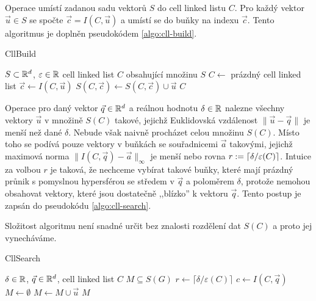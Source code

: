 Operace  umístí zadanou sadu vektorů $S$ do cell linked listu $C$. Pro každý vektor $\vec{u} \in S$ se spočte $\vec{c} = I(C, \vec{u})$ a umístí se do buňky na indexu $\vec{c}$. Tento algoritmus je doplněn pseudokódem \ref{algo:cll-build}.

\begin{algorithm}[ht!]
  \caption{CllBuild}
  \label{algo:cll-build}
  \begin{algorithmic}
    \Require $S \subset \mathbb{R}^d$, $\varepsilon \in \mathbb{R}$
    \Ensure cell linked list $C$ obsahující množinu $S$
    \State $C \leftarrow$ prázdný cell linked list
      \State $\vec{c} \leftarrow I(C, \vec{u})$
      \State $S(C, \vec{c}) \leftarrow S(C, \vec{c}) \cup \vec{u}$
    \EndFor
    \Return $C$
  \end{algorithmic}
\end{algorithm}

Operace  pro daný vektor $\vec{q} \in \mathbb{R}^d$ a reálnou hodnotu $\delta \in \mathbb{R}$ nalezne všechny vektory $\vec{u}$ v množině $S(C)$ takové, jejichž Euklidovská vzdálenost $\|\vec{u} - \vec{q}\|$ je menší než dané $\delta$. Nebude však naivně procházet celou množinu $S(C)$. Místo toho se podívá pouze vektory v buňkách se souřadnicemi $\vec{a}$ takovými, jejichž maximová norma $\|I(C, \vec{q}) - \vec{a}\|_\infty$ je menší nebo rovna $r := \lceil\delta / \varepsilon(C)\rceil$. Intuice za volbou $r$ je taková, že nechceme vybírat takové buňky, které mají prázdný průnik s pomyslnou hypersférou se středem v $\vec{q}$ a poloměrem $\delta$, protože nemohou obsahovat vektory, které jsou dostatečně ,,blízko'' k vektoru $\vec{q}$. Tento postup je zapsán do pseudokódu \ref{algo:cll-search}.

Složitost algoritmu  není snadné určit bez znalosti rozdělení dat $S(C)$ a proto jej vynecháváme.

\begin{algorithm}[ht!]
  \caption{CllSearch}
  \label{algo:cll-search}
  \begin{algorithmic}
    \Require $\delta \in \mathbb{R}$, $\vec{q} \in \mathbb{R}^d$, cell linked list $C$
    \Ensure $M \subseteq S(G)$
    \State $r \leftarrow \lceil\delta / \varepsilon(C)\rceil$
    \State $c \leftarrow I(C, \vec{q})$
    \State $M \leftarrow \emptyset$
        \State $M \leftarrow M \cup \vec{u}$
      \EndFor
    \EndFor
    \Return $M$
  \end{algorithmic}
\end{algorithm}

